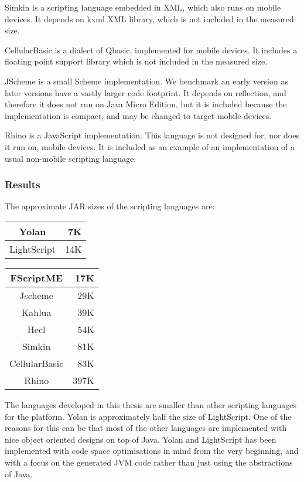 \documentclass[11pt]{report}
\begin{document}
Simkin \cite{simkin} is a scripting language embedded in XML, which also runs on mobile devices. It depends on kxml XML library, which is not included in the measured size. 

CellularBasic \cite{cellularbasic} is a dialect of Qbasic, implemented for mobile devices. 
It includes a floating point support library which is not included in the measured size. 

JScheme \cite{jscheme} is a small Scheme implementation. We benchmark an early version as later versions have a vastly larger code footprint. It depends on reflection, and therefore it does not run on Java Micro Edition, but it is included because the implementation is compact, and may be changed to target mobile devices.


Rhino \cite{rhino} is a JavaScript implementation. This language is not designed for, nor does it run on, mobile devices. It is included as an example of an implementation of a usual non-mobile scripting language.

\subsubsection{Results}
The approximate JAR sizes of the scripting languages are:
\begin{center}
\begin{tabular}{|c|r|} \hline 
Yolan & 7K \\ \hline 
LightScript & 14K \\ \hline 
\end{tabular}
\begin{tabular}{|c|r|} \hline 
FScriptME & 17K \\ \hline 
Jscheme & 29K \\ \hline 
Kahlua & 39K \\ \hline 
Hecl & 54K \\ \hline 
Simkin & 81K \\ \hline 
CellularBasic & 83K \\ \hline 
Rhino & 397K \\ \hline 
\end{tabular}
\end{center}

The languages developed in this thesis are smaller than other scripting languages for the platform. 
Yolan is approximately half the size of LightScript. 
One of the reasons for this can be that most of the other languages are implemented with nice object oriented designs on top of Java. Yolan and LightScript has been implemented with code space optimisations in mind from the very beginning, and with a focus on the generated JVM code rather than just using the abstractions of Java.
\end{document}

